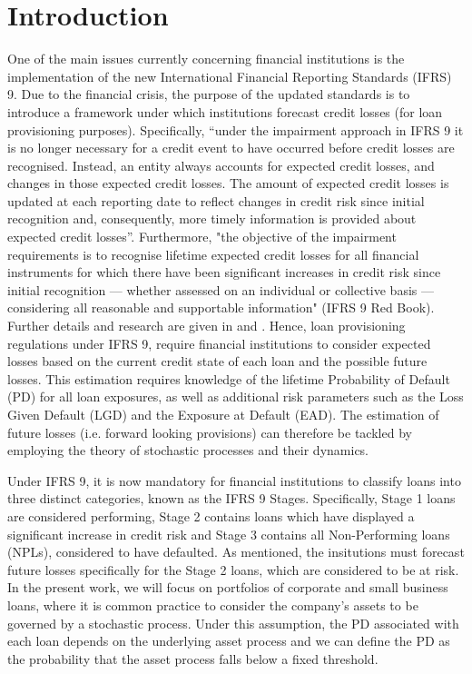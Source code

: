 \documentclass[11pt,reqno]{article}
\theoremstyle{definition}
\begin{document}
\section{Introduction}
One of the main issues currently concerning financial institutions is the implementation of the new International Financial Reporting Standards (IFRS) 9. Due to the financial crisis, the purpose of the updated standards is to introduce a framework under which institutions forecast credit losses (for loan provisioning purposes). Specifically, “under the impairment approach in IFRS 9 it is no longer necessary for a credit event to have occurred before credit losses are recognised. Instead, an entity always accounts for expected credit losses, and changes in those expected credit losses. The amount of expected credit losses is updated at each reporting date to reflect changes in credit risk since initial recognition and, consequently, more timely information is provided about expected credit losses”. Furthermore, "the objective of the impairment requirements is to recognise lifetime expected credit losses for all financial instruments for which there have been significant increases in credit risk since initial recognition — whether assessed on an individual or collective basis — considering all reasonable and supportable information" (IFRS 9 Red Book). Further details and research are given in \cite{beerbaum2015significant} and \cite{xu2016estimating}. Hence, loan provisioning regulations under IFRS 9, require financial institutions to consider expected losses based on the current credit state of each loan and the possible future losses. This estimation requires knowledge of the lifetime Probability of Default (PD) for all loan exposures, as well as additional risk parameters such as the Loss Given Default (LGD) and the Exposure at Default (EAD). The estimation of future losses (i.e. forward looking provisions) can therefore be tackled by employing the theory of stochastic processes and their dynamics.
\par Under IFRS 9, it is now mandatory for financial institutions to classify loans into three distinct categories, known as the IFRS 9 Stages. Specifically, Stage 1 loans are considered performing, Stage 2 contains loans which have displayed a significant increase in credit risk and Stage 3 contains all Non-Performing loans (NPLs), considered to have defaulted. As mentioned, the insitutions must forecast future losses specifically for the Stage 2 loans, which are considered to be at risk. In the present work, we will focus on portfolios of corporate and small business loans, where it is common practice to consider the company's assets to be governed by a stochastic process. Under this assumption, the PD associated with each loan depends on the underlying asset process and we can define the PD as the probability that the asset process falls below a fixed threshold. 
\end{document}
